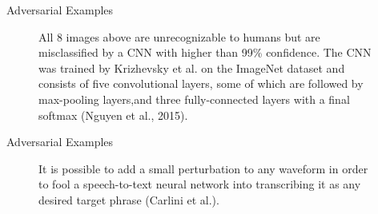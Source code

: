 \begin{frame} {Adversarial Examples}
  \begin{figure}
    \centering
       \captionsetup{font=footnotesize,labelfont=footnotesize, labelfont = bf}
      \caption{\footnotesize All 8 images above are unrecognizable to humans but are misclassified by a CNN with higher than 99\% confidence.  The CNN was trained by Krizhevsky et al. on the ImageNet dataset and consists of five convolutional layers, some of which are followed by max-pooling layers,and three fully-connected layers with a final softmax (Nguyen et al., 2015).}
  \end{figure}
\end{frame}

\begin{frame} {Adversarial Examples}
  \begin{figure}
    \centering
      \caption{\footnotesize  It is possible to add a small perturbation to any waveform in order to fool a speech-to-text neural network into transcribing it as any desired target phrase (Carlini et al.). 
      }
  \end{figure}
\end{frame}


